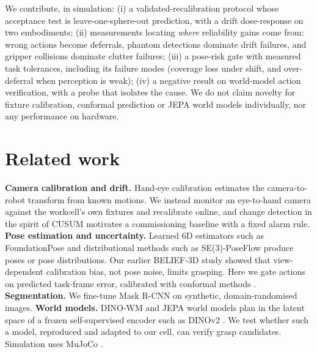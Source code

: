 \documentclass[10pt,twocolumn]{article}
\begin{document}
We contribute, in simulation:
(i) a validated-recalibration protocol whose acceptance test is leave-one-sphere-out prediction, with a drift
dose-response on two embodiments;
(ii) measurements locating \emph{where} reliability gains come from: wrong actions become deferrals, phantom
detections dominate drift failures, and gripper collisions dominate clutter failures;
(iii) a pose-risk gate with measured task tolerances, including its failure modes (coverage loss under shift, and
over-deferral when perception is weak);
(iv) a negative result on world-model action verification, with a probe that isolates the cause.
We do not claim novelty for fixture calibration, conformal prediction or JEPA world models individually, nor any
performance on hardware.

\section{Related work}
\textbf{Camera calibration and drift.} Hand-eye calibration \citep{tsai1989handeye} estimates the camera-to-robot
transform from known motions. We instead monitor an eye-to-hand camera against the workcell's own fixtures and
recalibrate online, and change detection in the spirit of CUSUM \citep{page1954cusum} motivates a commissioning
baseline with a fixed alarm rule.
\textbf{Pose estimation and uncertainty.} Learned 6D estimators such as FoundationPose \citep{wen2024foundationpose}
and distributional methods such as SE(3)-PoseFlow \citep{jin2025poseflow} produce poses or pose distributions. Our
earlier BELIEF-3D study \citep{madan2026belief3d} showed that view-dependent calibration bias, not pose noise, limits
grasping. Here we gate actions on predicted task-frame error, calibrated with conformal methods
\citep{angelopoulos2021gentle}.
\textbf{Segmentation.} We fine-tune Mask R-CNN \citep{he2017maskrcnn} on synthetic, domain-randomised images.
\textbf{World models.} DINO-WM \citep{zhou2024dinowm} and JEPA world models \citep{terver2025jepawms} plan in the
latent space of a frozen self-supervised encoder such as DINOv2 \citep{oquab2023dinov2}. We test whether such a model,
reproduced and adapted to our cell, can verify grasp candidates. Simulation uses MuJoCo \citep{todorov2012mujoco}.
\end{document}
